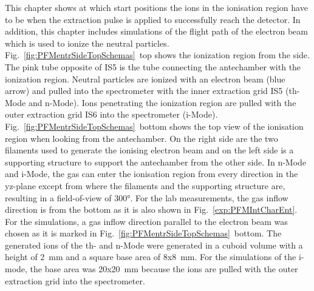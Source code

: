 	This chapter shows at which start positions the ions in the ionisation region have to be when the extraction pulse is applied to successfully reach the detector. In addition, this chapter includes simulations of the flight path of the electron beam which is used to ionize the neutral particles.\\
	Fig.~\ref{fig:PFMentrSideTopSchemas}~top shows the ionization region from the side. The pink tube opposite of IS5 is the tube connecting the antechamber with the ionization region. Neutral particles are ionized with an electron beam (blue arrow) and pulled into the spectrometer with the inner extraction grid IS5 (th-Mode and n-Mode). Ions penetrating the ionization region are pulled with the outer extraction grid IS6 into the spectrometer (i-Mode). Fig.~\ref{fig:PFMentrSideTopSchemas}~bottom shows the top view of the ionisation region when looking from the antechamber. On the right side are the two filaments used to generate the ionising electron beam and on the left side is a supporting structure to support the antechamber from the other side. In n-Mode and i-Mode, the gas can enter the ionisation region from every direction in the yz-plane except from where the filaments and the supporting structure are, resulting in a field-of-view of 300°. For the lab measurements, the gas inflow direction is from the bottom as it is also shown in Fig.~\ref{exp:PFMIntCharEnt}. For the simulations, a gas inflow direction parallel to the electron beam was chosen as it is marked in Fig.~\ref{fig:PFMentrSideTopSchemas}~bottom. The generated ions of the th- and n-Mode were generated in a cuboid volume with a height of 2~mm and a square base area of 8x8~mm. For the simulations of the i-mode, the base area was 20x20~mm because the ions are pulled with the outer extraction grid into the spectrometer.\\

